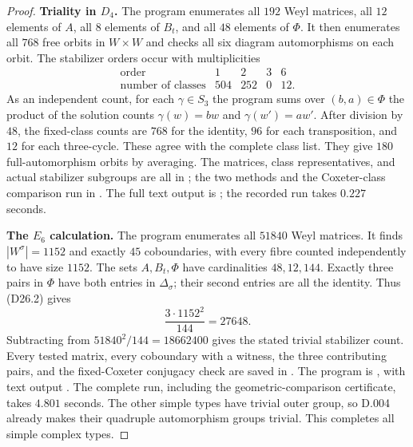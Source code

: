 \begin{proof}
\medskip\noindent\textbf{Triality in $D_4$.}
The program enumerates all $192$ Weyl matrices, all $12$ elements
of $A$, all $8$ elements of $B_t$, and all $48$ elements of $\Phi$.
It then enumerates all $768$ free orbits in $W\times W$ and
checks all six diagram automorphisms on each orbit.
The stabilizer orders occur with multiplicities
\[
\begin{array}{c|rrrr}
\text{order}&1&2&3&6\\\hline
\text{number of classes}&504&252&0&12.
\end{array}
\]
As an independent count, for each $\gamma\in S_3$ the program
sums over $(b,a)\in\Phi$ the product of the solution counts
$\gamma(w)=bw$ and $\gamma(w')=aw'$.
After division by $48$, the fixed-class counts are
$768$ for the identity, $96$ for each transposition, and $12$
for each three-cycle.  These agree with the complete class list.
They give $180$ full-automorphism orbits by averaging.
The matrices, class representatives, and actual stabilizer subgroups
are all in ; the two methods
and the Coxeter-class comparison run in
.
The full text output is
;
the recorded run takes $0.227$ seconds.

\medskip\noindent\textbf{The $E_6$ calculation.}
The program enumerates all $51840$ Weyl matrices.
It finds $|W^\sigma|=1152$ and exactly $45$ coboundaries,
with every fibre counted independently to have size $1152$.
The sets $A,B_t,\Phi$ have cardinalities $48,12,144$.
Exactly three pairs in $\Phi$ have both entries in
$\Delta_\sigma$; their second entries are all the identity.
Thus (D26.2) gives
\[
 \frac{3\cdot1152^2}{144}=27648.
\]
Subtracting from $51840^2/144=18662400$ gives the stated trivial
stabilizer count.  Every tested matrix, every coboundary with a
witness, the three contributing pairs, and the fixed-Coxeter
conjugacy check are saved in .
The program is ,
with text output .
The complete run, including the geometric-comparison certificate,
takes $4.801$ seconds.  The other simple types have trivial outer
group, so D.004 already makes their quadruple automorphism groups
trivial.  This completes all simple complex types.
\end{proof}

